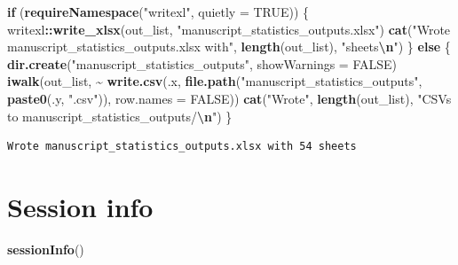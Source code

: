 \documentclass[
  landscape]{article}
\newenvironment{Shaded}{\begin{snugshade}}{\end{snugshade}}
\newcommand{\AttributeTok}[1]{\textcolor[rgb]{0.13,0.29,0.53}{#1}}
\newcommand{\ConstantTok}[1]{\textcolor[rgb]{0.56,0.35,0.01}{#1}}
\newcommand{\ControlFlowTok}[1]{\textcolor[rgb]{0.13,0.29,0.53}{\textbf{#1}}}
\newcommand{\FunctionTok}[1]{\textcolor[rgb]{0.13,0.29,0.53}{\textbf{#1}}}
\newcommand{\NormalTok}[1]{#1}
\newcommand{\SpecialCharTok}[1]{\textcolor[rgb]{0.81,0.36,0.00}{\textbf{#1}}}
\newcommand{\StringTok}[1]{\textcolor[rgb]{0.31,0.60,0.02}{#1}}
\begin{document}
\begin{Shaded}
\begin{Highlighting}[]
\ControlFlowTok{if}\NormalTok{ (}\FunctionTok{requireNamespace}\NormalTok{(}\StringTok{"writexl"}\NormalTok{, }\AttributeTok{quietly =} \ConstantTok{TRUE}\NormalTok{)) \{}
\NormalTok{  writexl}\SpecialCharTok{::}\FunctionTok{write\_xlsx}\NormalTok{(out\_list, }\StringTok{"manuscript\_statistics\_outputs.xlsx"}\NormalTok{)}
  \FunctionTok{cat}\NormalTok{(}\StringTok{"Wrote manuscript\_statistics\_outputs.xlsx with"}\NormalTok{, }\FunctionTok{length}\NormalTok{(out\_list), }\StringTok{"sheets}\SpecialCharTok{\textbackslash{}n}\StringTok{"}\NormalTok{)}
\NormalTok{\} }\ControlFlowTok{else}\NormalTok{ \{}
  \FunctionTok{dir.create}\NormalTok{(}\StringTok{"manuscript\_statistics\_outputs"}\NormalTok{, }\AttributeTok{showWarnings =} \ConstantTok{FALSE}\NormalTok{)}
  \FunctionTok{iwalk}\NormalTok{(out\_list, }\SpecialCharTok{\textasciitilde{}} \FunctionTok{write.csv}\NormalTok{(.x, }\FunctionTok{file.path}\NormalTok{(}\StringTok{"manuscript\_statistics\_outputs"}\NormalTok{, }\FunctionTok{paste0}\NormalTok{(.y, }\StringTok{".csv"}\NormalTok{)),}
                              \AttributeTok{row.names =} \ConstantTok{FALSE}\NormalTok{))}
  \FunctionTok{cat}\NormalTok{(}\StringTok{"Wrote"}\NormalTok{, }\FunctionTok{length}\NormalTok{(out\_list), }\StringTok{"CSVs to manuscript\_statistics\_outputs/}\SpecialCharTok{\textbackslash{}n}\StringTok{"}\NormalTok{)}
\NormalTok{\}}
\end{Highlighting}
\end{Shaded}

\begin{verbatim}
Wrote manuscript_statistics_outputs.xlsx with 54 sheets
\end{verbatim}

\section{Session info}\label{session-info}

\begin{Shaded}
\begin{Highlighting}[]
\FunctionTok{sessionInfo}\NormalTok{()}
\end{Highlighting}
\end{Shaded}
\end{document}
